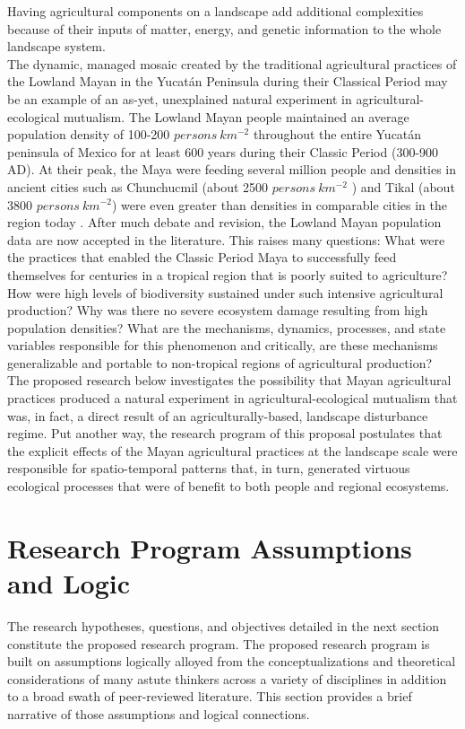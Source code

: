 Having agricultural components on a landscape add additional complexities because of their inputs of matter, energy, and genetic information to the whole landscape system. \\

The dynamic, managed mosaic created by the traditional agricultural practices of the Lowland Mayan in the Yucat\'{a}n Peninsula during their Classical Period may be an example of an as-yet, unexplained natural experiment in agricultural-ecological mutualism. The Lowland Mayan people maintained an average population density of 100-200 $persons \ km^{-2}$ throughout the entire Yucat\'{a}n peninsula of Mexico for at least 600 years during their Classic Period (300-900 AD). At their peak, the Maya were feeding several million people \citep{gomez-pompa_lowland_2003} and densities in ancient cities such as Chunchucmil (about 2500  $persons \ km^{-2}$ ) and Tikal (about 3800 $persons \ km^{-2}$) were even greater than densities in comparable cities in the region today \citep{dahlin_reconstructing_2005, faust_maya_2001}.  After much debate and revision, the Lowland Mayan population data are now accepted in the literature. This raises many questions: What were the practices that enabled the Classic Period Maya to successfully feed themselves for centuries in a tropical region that is poorly suited to agriculture?  How were high levels of biodiversity sustained under such intensive agricultural production?  Why was there no severe ecosystem damage resulting from high population densities? What are the mechanisms, dynamics, processes, and state variables responsible for this phenomenon and critically, are these mechanisms generalizable and portable to non-tropical regions of agricultural production? \\

The proposed research below investigates the possibility that Mayan agricultural practices produced a natural experiment in agricultural-ecological mutualism that was, in fact, a direct result of an agriculturally-based, landscape disturbance regime. Put another way, the research program of this proposal postulates that the explicit effects of the Mayan agricultural practices at the landscape scale were responsible for spatio-temporal patterns that, in turn, generated virtuous ecological processes that were of benefit to both people and regional ecosystems.\\ 

\section{Research Program Assumptions and Logic}
The research hypotheses, questions, and objectives detailed in the next section constitute the proposed research program. The proposed research program is built on assumptions logically alloyed from the conceptualizations and theoretical considerations of many astute thinkers across a variety of disciplines in addition to a broad swath of peer-reviewed literature. This section provides a brief narrative of those assumptions and logical connections.\\

